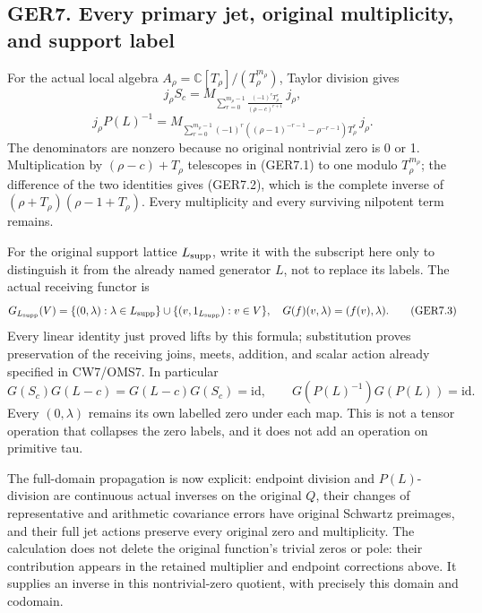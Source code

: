 \subsection{GER7. Every primary jet, original multiplicity, and support
label}\label{ger7.-every-primary-jet-original-multiplicity-and-support-label}

For the actual local algebra
\(A_\rho=\mathbb C[T_\rho]/(T_\rho^{m_\rho})\), Taylor division gives \[
j_\rho S_c=
M_{\displaystyle\sum_{r=0}^{m_\rho-1}
\frac{(-1)^rT_\rho^r}{(\rho-c)^{r+1}}}\,j_\rho,
\tag{GER7.1}
\] \[
j_\rho P(L)^{-1}=
M_{\displaystyle\sum_{r=0}^{m_\rho-1}(-1)^r
\left((\rho-1)^{-r-1}-\rho^{-r-1}\right)T_\rho^r}\,j_\rho.
\tag{GER7.2}
\] The denominators are nonzero because no original nontrivial zero is 0
or 1. Multiplication by \((\rho-c)+T_\rho\) telescopes in (GER7.1) to
one modulo \(T_\rho^{m_\rho}\); the difference of the two identities
gives (GER7.2), which is the complete inverse of
\((\rho+T_\rho)(\rho-1+T_\rho)\). Every multiplicity and every surviving
nilpotent term remains.

For the original support lattice \(L_{\rm supp}\), write it with the
subscript here only to distinguish it from the already named generator
\(L\), not to replace its labels. The actual receiving functor is \[
G_{L_{\rm supp}}(V)=
\{(0,\lambda):\lambda\in L_{\rm supp}\}
\cup\{(v,1_{L_{\rm supp}}):v\in V\},
\quad G(f)(v,\lambda)=(f(v),\lambda).
\tag{GER7.3}
\] Every linear identity just proved lifts by this formula; substitution
proves preservation of the receiving joins, meets, addition, and scalar
action already specified in CW7/OMS7. In particular \[
G(S_c)G(L-c)=G(L-c)G(S_c)=\mathrm{id},\qquad
G(P(L)^{-1})G(P(L))=\mathrm{id}.
\tag{GER7.4}
\] Every \((0,\lambda)\) remains its own labelled zero under each map.
This is not a tensor operation that collapses the zero labels, and it
does not add an operation on primitive tau.

The full-domain propagation is now explicit: endpoint division and
\(P(L)\)-division are continuous actual inverses on the original \(Q\),
their changes of representative and arithmetic covariance errors have
original Schwartz preimages, and their full jet actions preserve every
original zero and multiplicity. The calculation does not delete the
original function's trivial zeros or pole: their contribution appears in
the retained multiplier and endpoint corrections above. It supplies an
inverse in this nontrivial-zero quotient, with precisely this domain and
codomain.
